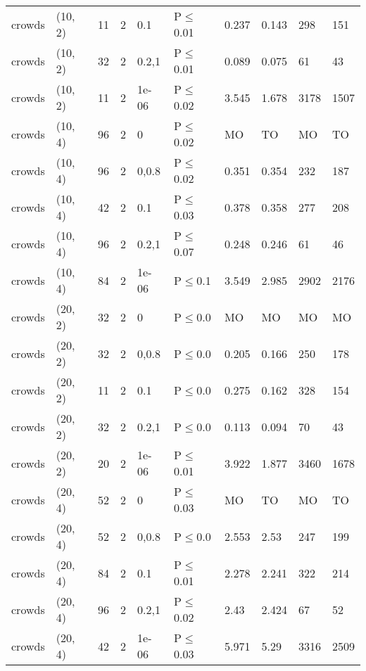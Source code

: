 \begin{longtable}{llrrllllll}
 crowds        & (10, 2)   &     	11 &   2 & 0.1   & P$\leq$0.01  & 0.237   & 0.143    & 298    & 151    \\
 crowds        & (10, 2)   &     	32 &   2 & 0.2,1 & P$\leq$0.01  & 0.089   & 0.075    & 61     & 43     \\
 crowds        & (10, 2)   &     	11 &   2 & 1e-06 & P$\leq$0.02  & 3.545   & 1.678    & 3178   & 1507   \\
 crowds        & (10, 4)   &     	96 &   2 & 0     & P$\leq$0.02  & MO      & TO       & MO     & TO     \\
 crowds        & (10, 4)   &     	96 &   2 & 0,0.8 & P$\leq$0.02  & 0.351   & 0.354    & 232    & 187    \\
 crowds        & (10, 4)   &     	42 &   2 & 0.1   & P$\leq$0.03  & 0.378   & 0.358    & 277    & 208    \\
 crowds        & (10, 4)   &     	96 &   2 & 0.2,1 & P$\leq$0.07  & 0.248   & 0.246    & 61     & 46     \\
 crowds        & (10, 4)   &     	84 &   2 & 1e-06 & P$\leq$0.1   & 3.549   & 2.985    & 2902   & 2176   \\
 crowds        & (20, 2)   &     	32 &   2 & 0     & P$\leq$0.0   & MO      & MO       & MO     & MO     \\
 crowds        & (20, 2)   &     	32 &   2 & 0,0.8 & P$\leq$0.0   & 0.205   & 0.166    & 250    & 178    \\
 crowds        & (20, 2)   &     	11 &   2 & 0.1   & P$\leq$0.0   & 0.275   & 0.162    & 328    & 154    \\
 crowds        & (20, 2)   &     	32 &   2 & 0.2,1 & P$\leq$0.0   & 0.113   & 0.094    & 70     & 43     \\
 crowds        & (20, 2)   &     	20 &   2 & 1e-06 & P$\leq$0.01  & 3.922   & 1.877    & 3460   & 1678   \\
 crowds        & (20, 4)   &     	52 &   2 & 0     & P$\leq$0.03  & MO      & TO       & MO     & TO     \\
 crowds        & (20, 4)   &     	52 &   2 & 0,0.8 & P$\leq$0.0   & 2.553   & 2.53     & 247    & 199    \\
 crowds        & (20, 4)   &     	84 &   2 & 0.1   & P$\leq$0.01  & 2.278   & 2.241    & 322    & 214    \\
 crowds        & (20, 4)   &     	96 &   2 & 0.2,1 & P$\leq$0.02  & 2.43    & 2.424    & 67     & 52     \\
 crowds        & (20, 4)   &     	42 &   2 & 1e-06 & P$\leq$0.03  & 5.971   & 5.29     & 3316   & 2509   \\

\end{longtable}
